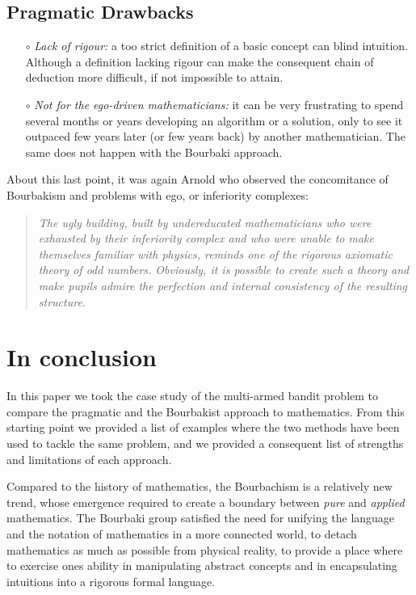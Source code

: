 \documentclass[]{scrartcl}
\theoremstyle{definition}
\begin{document}
\subsection*{Pragmatic Drawbacks}



\begin{itemize}
    \item[$\circ$] \emph{Lack of rigour:} a too strict definition of a basic concept can blind intuition. Although a definition lacking rigour can make the consequent chain of deduction more difficult, if not impossible to attain.
    
    \item[$\circ$] \emph{Not for the ego-driven mathematicians:} it can be very frustrating to spend several months or years developing an algorithm or a solution, only to see it outpaced few years later (or few years back) by another mathematician. 
    The same does not happen with the Bourbaki approach.

\end{itemize}

About this last point, it was again Arnold who observed the concomitance of Bourbakism and problems with ego, or inferiority complexes:

\begin{quotation}
    \emph{The ugly building, built by undereducated mathematicians who were exhausted by their inferiority complex and who were unable to make themselves familiar with physics, reminds one of the rigorous axiomatic theory of odd numbers. Obviously, it is possible to create such a theory and make pupils admire the perfection and internal consistency of the resulting structure.}~\cite{arnol1998teaching}
\end{quotation}


\section{In conclusion}

In this paper we took the case study of the multi-armed bandit problem to compare the pragmatic and the Bourbakist approach to mathematics. From this starting point we provided a list of examples where the two methods have been used to tackle the same problem, and we provided a consequent list of strengths and limitations of each approach. 

Compared to the history of mathematics, the Bourbachism is a relatively new trend, whose emergence required to create a boundary between \emph{pure} and \emph{applied} mathematics. The Bourbaki group satisfied the need for unifying the language and the notation of mathematics in a more connected world, to detach mathematics as much as possible from physical reality, to provide a place where to exercise ones ability in manipulating abstract concepts and in encapsulating intuitions into a rigorous formal language.
\end{document}
